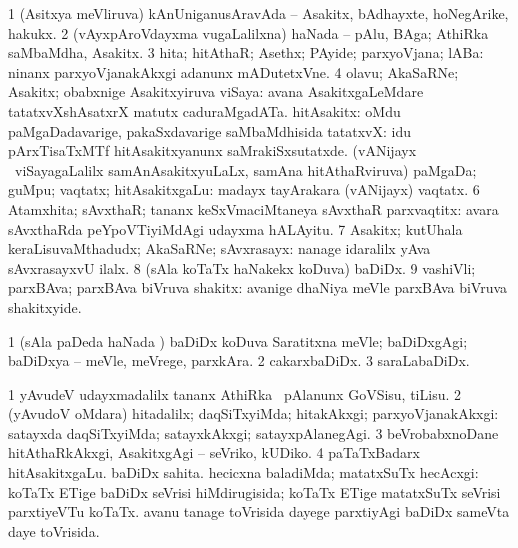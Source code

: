 \bentry
{}
\gl{\nA}
\bmng
\bnum
\num{1} (Asitxya meVliruva) kAnUniganusAravAda -- Asakitx, bAdhayxte, hoNegArike, hakukx. 
\num{2} (vAyxpAroVdayxma \mo vugaLalilxna) haNada -- pAlu, BAga; AthiRka saMbaMdha, Asakitx. 
\num{3} hita; hitAthaR; Asethx; PAyide; parxyoVjana; lABa:  ninanx parxyoVjanakAkxgi adanunx mADutetxVne. 
\num{4} olavu; AkaSaRNe; Asakitx; obabxnige Asakitxyiruva viSaya:  avana AsakitxgaLeMdare tatatxvXshAsatxrX matutx caduraMgadATa. 
 hitAsakitx: 
\banum
{} oMdu paMgaDadavarige, pakaSxdavarige saMbaMdhisida tatatxvX:  idu pArxTisaTxMTf hitAsakitxyanunx saMrakiSxsutatxde. 
 (vANijayx \mo\ viSayagaLalilx samAnAsakitxyuLaLx, samAna hitAthaRviruva) paMgaDa; guMpu; vaqtatx; hitAsakitxgaLu:  madayx tayArakara (vANijayx) vaqtatx. 
\eanum
\numie
\num{6} Atamxhita; sAvxthaR; tananx keSxVmaciMtaneya sAvxthaR parxvaqtitx:  avara sAvxthaRda peYpoVTiyiMdAgi udayxma hALAyitu. 
\num{7} Asakitx; kutUhala keraLisuvaMthadudx; AkaSaRNe; sAvxrasayx:  nanage idaralilx yAva sAvxrasayxvU ilalx. 
\num{8} (sAla koTaTx haNakekx koDuva) baDiDx. 
\num{9} vashiVli; parxBAva; parxBAva biVruva shakitx:  avanige dhaNiya meVle parxBAva biVruva shakitxyide. 
\enum
\emng

\noindent 
\gl{\pagu}
\bmng
\bnum
\num{1}  (sAla paDeda haNada \vi) baDiDx koDuva Saratitxna meVle; baDiDxgAgi; baDiDxya -- meVle, meVrege, parxkAra. 
\num{2}  cakarxbaDiDx. 
\num{3}  saraLabaDiDx. 
\enum
\emng

\noindent 
\gl{\nuga}
\bmng
\bnum
\num{1}   yAvudeV udayxmadalilx tananx AthiRka \mo\ pAlanunx GoVSisu, tiLisu. 
\num{2}  (yAvudoV oMdara) hitadalilx; daqSiTxyiMda; hitakAkxgi; parxyoVjanakAkxgi:  satayxda daqSiTxyiMda; satayxkAkxgi; satayxpAlanegAgi. 
\num{3}  beVrobabxnoDane hitAthaRkAkxgi, AsakitxgAgi -- seVriko, kUDiko. 
\num{4}  paTaTxBadarx hitAsakitxgaLu. 
  
\banum
{} baDiDx sahita. 
 hecicxna baladiMda; matatxSuTx hecAcxgi:  koTaTx ETige baDiDx seVrisi hiMdirugisida; koTaTx ETige matatxSuTx seVrisi parxtiyeVTu koTaTx.  avanu tanage toVrisida dayege parxtiyAgi baDiDx sameVta daye toVrisida. 
\eanum
\numie
\enum
\emng
\eentry

